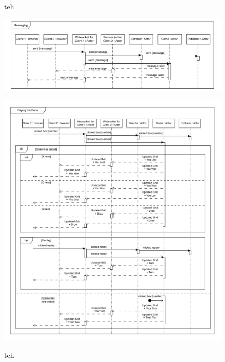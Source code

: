 \documentclass[]{project_interim}
\begin{document}
\begin{figure}[ht!]
  \centering
  \caption{teh}
  \vspace*{0.5cm}
  \includegraphics[width=\linewidth]{sequence_messaging}
  \label{fig: 5}
  \caption{teh}
  \vspace*{0.5cm}
  \includegraphics[width=\linewidth]{sequence_playing}
  \label{fig: 6}
\end{figure}
\end{document}

